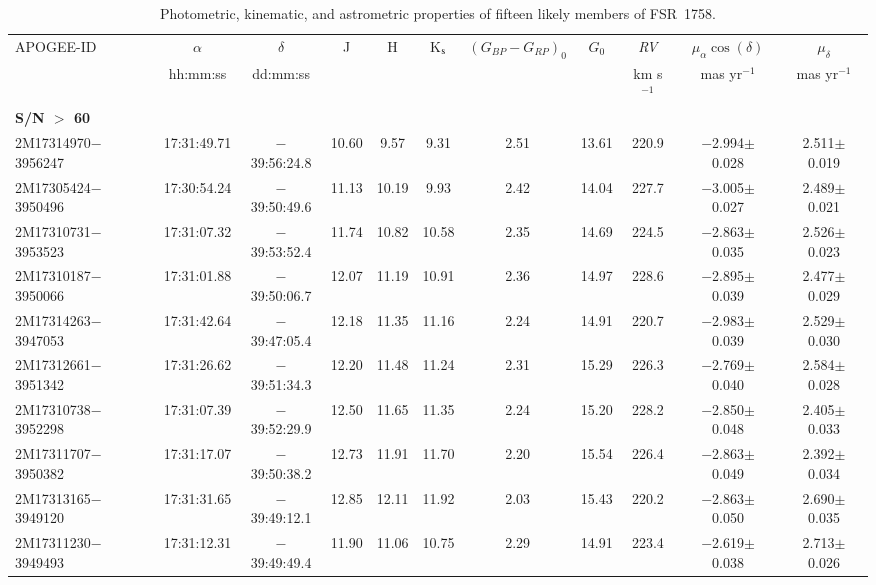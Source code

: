 \documentclass[longauth]{aa} %
\begin{document}
\begin{table*}
	\begin{center}
		\setlength{\tabcolsep}{0.7mm}  
		\caption{Photometric, kinematic, and astrometric properties of fifteen likely members of FSR~1758.}
		\begin{tabular}{lcccccccccc}
			\hline
			\hline
			APOGEE-ID & $\alpha$ & $\delta$ & J  & H  & K$_{\rm s}$	 & $(G_{BP} - G_{RP})_{0}$ & $G_0$ & \textit{RV} & $\mu_{\alpha}\cos{}(\delta)$ & $\mu_{\delta}$ \\	
			& hh:mm:ss & dd:mm:ss  &   &   &  	 &  & & km s$^{-1}$ & mas yr$^{-1}$ & mas yr$^{-1}$ \\	
			\hline
			\hline
		{\bf  S/N $>$ 60} & & &  &  & 	 & & &  &  &  \\	
			\hline
			\hline
			2M17314970$-$3956247 & 17:31:49.71 & $-$39:56:24.8 & 10.60 &  9.57 &  9.31 &  2.51 & 13.61 &  220.9    & $-$2.994$\pm$ 0.028  &  2.511$\pm$0.019 \\
			2M17305424$-$3950496 & 17:30:54.24 & $-$39:50:49.6 & 11.13 & 10.19 &  9.93 &  2.42 & 14.04 &  227.7  & $-$3.005$\pm$ 0.027  &  2.489$\pm$0.021 \\
			2M17310731$-$3953523 & 17:31:07.32 & $-$39:53:52.4 & 11.74 & 10.82 & 10.58 &  2.35 & 14.69 &  224.5 & $-$2.863$\pm$ 0.035  &  2.526$\pm$0.023 \\
			2M17310187$-$3950066 & 17:31:01.88 & $-$39:50:06.7 & 12.07 & 11.19 & 10.91 &  2.36 & 14.97 &  228.6 & $-$2.895$\pm$ 0.039  &  2.477$\pm$0.029 \\
			2M17314263$-$3947053 & 17:31:42.64 & $-$39:47:05.4 & 12.18 & 11.35 & 11.16 &  2.24 & 14.91 &  220.7 & $-$2.983$\pm$ 0.039  &  2.529$\pm$0.030 \\
			2M17312661$-$3951342 & 17:31:26.62 & $-$39:51:34.3 & 12.20 & 11.48 & 11.24 &  2.31 & 15.29 &  226.3 & $-$2.769$\pm$ 0.040  &  2.584$\pm$0.028 \\
			2M17310738$-$3952298 & 17:31:07.39 & $-$39:52:29.9 & 12.50 & 11.65 & 11.35 &  2.24 & 15.20 &  228.2 & $-$2.850$\pm$ 0.048  &  2.405$\pm$0.033 \\
			2M17311707$-$3950382 & 17:31:17.07 & $-$39:50:38.2 & 12.73 & 11.91 & 11.70 &  2.20 & 15.54 &  226.4 & $-$2.863$\pm$ 0.049  &  2.392$\pm$0.034 \\
			2M17313165$-$3949120 & 17:31:31.65 & $-$39:49:12.1 & 12.85 & 12.11 & 11.92 &  2.03 & 15.43 &  220.2 & $-$2.863$\pm$ 0.050  &  2.690$\pm$0.035 \\
			2M17311230$-$3949493 & 17:31:12.31 & $-$39:49:49.4 & 11.90 & 11.06 & 10.75 &  2.29 & 14.91 &  223.4 & $-$2.619$\pm$ 0.038  &  2.713$\pm$0.026 \\

\end{tabular}
\end{center}
\end{table*}
\end{document}
